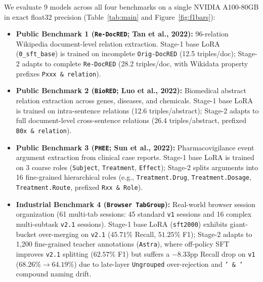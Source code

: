 \documentclass[11pt,a4paper]{article}
\begin{document}
We evaluate 9 models across all four benchmarks on a single NVIDIA A100-80GB in exact float32 precision (Table~\ref{tab:main} and Figure~\ref{fig:f1bars}):
\begin{itemize}
    \item \textbf{Public Benchmark 1 (\texttt{Re-DocRED}; Tan et al., 2022):} 96-relation Wikipedia document-level relation extraction. Stage-1 base LoRA (\texttt{0\_sft\_base}) is trained on incomplete \texttt{Orig-DocRED} (12.5 triples/doc); Stage-2 adapts to complete \texttt{Re-DocRED} (28.2 triples/doc, with Wikidata property prefixes \texttt{Pxxx \& relation}).
    \item \textbf{Public Benchmark 2 (\texttt{BioRED}; Luo et al., 2022):} Biomedical abstract relation extraction across genes, diseases, and chemicals. Stage-1 base LoRA is trained on intra-sentence relations (12.6 triples/abstract); Stage-2 adapts to full document-level cross-sentence relations (26.4 triples/abstract, prefixed \texttt{B0x \& relation}).
    \item \textbf{Public Benchmark 3 (\texttt{PHEE}; Sun et al., 2022):} Pharmacovigilance event argument extraction from clinical case reports. Stage-1 base LoRA is trained on 3 coarse roles (\texttt{Subject}, \texttt{Treatment}, \texttt{Effect}); Stage-2 splits arguments into 16 fine-grained hierarchical roles (e.g., \texttt{Treatment.Drug}, \texttt{Treatment.Dosage}, \texttt{Treatment.Route}, prefixed \texttt{Rxx \& Role}).
    \item \textbf{Industrial Benchmark 4 (\texttt{Browser TabGroup}):} Real-world browser session organization (61 multi-tab sessions: 45 standard \texttt{v1} sessions and 16 complex multi-subtask \texttt{v2.1} sessions). Stage-1 base LoRA (\texttt{sft2000}) exhibits giant-bucket over-merging on \texttt{v2.1} ($45.71\%$ Recall, $51.25\%$ F1); Stage-2 adapts to 1,200 fine-grained teacher annotations (\texttt{Astra}), where off-policy SFT improves \texttt{v2.1} splitting ($62.57\%$ F1) but suffers a $-8.33\text{pp}$ Recall drop on \texttt{v1} ($68.26\% \to 64.19\%$) due to late-layer \texttt{Ungrouped} over-rejection and \texttt{' \& '} compound naming drift.
\end{itemize}
\end{document}
